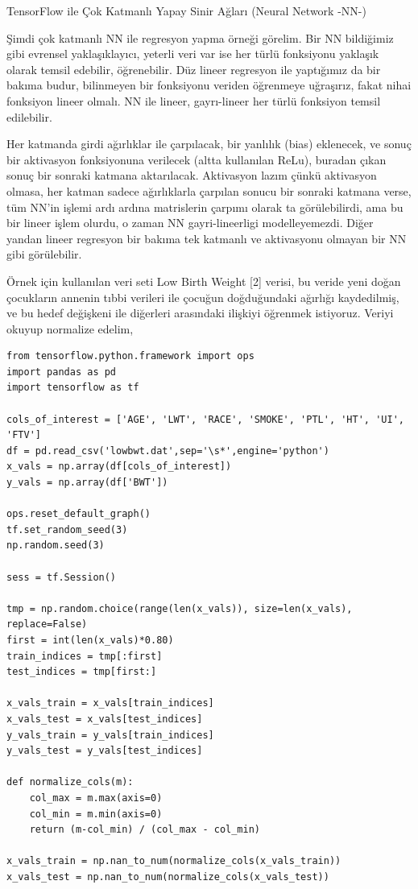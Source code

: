 \documentclass[12pt,fleqn]{article}\usepackage{../../common}
\begin{document}
TensorFlow ile Çok Katmanlı Yapay Sinir Ağları (Neural Network -NN-)

Şimdi çok katmanlı NN ile regresyon yapma örneği görelim. Bir NN bildiğimiz
gibi evrensel yaklaşıklayıcı, yeterli veri var ise her türlü fonksiyonu
yaklaşık olarak temsil edebilir, öğrenebilir. Düz lineer regresyon ile
yaptığımız da bir bakıma budur, bilinmeyen bir fonksiyonu veriden öğrenmeye
uğraşırız, fakat nihai fonksiyon lineer olmalı. NN ile lineer, gayrı-lineer
her türlü fonksiyon temsil edilebilir.

Her katmanda girdi ağırlıklar ile çarpılacak, bir yanlılık (bias)
eklenecek, ve sonuç bir aktivasyon fonksiyonuna verilecek (altta kullanılan
ReLu), buradan çıkan sonuç bir sonraki katmana aktarılacak. Aktivasyon
lazım çünkü aktivasyon olmasa, her katman sadece ağırlıklarla çarpılan
sonucu bir sonraki katmana verse, tüm NN'in işlemi ardı ardına matrislerin
çarpımı olarak ta görülebilirdi, ama bu bir lineer işlem olurdu, o zaman NN
gayri-lineerligi modelleyemezdi. Diğer yandan lineer regresyon bir bakıma
tek katmanlı ve aktivasyonu olmayan bir NN gibi görülebilir.

Örnek için kullanılan veri seti Low Birth Weight [2] verisi, bu veride
yeni doğan çocukların annenin tıbbi verileri ile çocuğun doğduğundaki
ağırlığı kaydedilmiş, ve bu hedef değişkeni ile diğerleri arasındaki
ilişkiyi öğrenmek istiyoruz. Veriyi okuyup normalize edelim,

\begin{verbatim}
from tensorflow.python.framework import ops
import pandas as pd
import tensorflow as tf

cols_of_interest = ['AGE', 'LWT', 'RACE', 'SMOKE', 'PTL', 'HT', 'UI', 'FTV']
df = pd.read_csv('lowbwt.dat',sep='\s*',engine='python')
x_vals = np.array(df[cols_of_interest])
y_vals = np.array(df['BWT'])

ops.reset_default_graph()
tf.set_random_seed(3)
np.random.seed(3)

sess = tf.Session()

tmp = np.random.choice(range(len(x_vals)), size=len(x_vals), replace=False)
first = int(len(x_vals)*0.80)
train_indices = tmp[:first]
test_indices = tmp[first:]

x_vals_train = x_vals[train_indices]
x_vals_test = x_vals[test_indices]
y_vals_train = y_vals[train_indices]
y_vals_test = y_vals[test_indices]

def normalize_cols(m):
    col_max = m.max(axis=0)
    col_min = m.min(axis=0)
    return (m-col_min) / (col_max - col_min)
    
x_vals_train = np.nan_to_num(normalize_cols(x_vals_train))
x_vals_test = np.nan_to_num(normalize_cols(x_vals_test))
\end{verbatim}
\end{document}
